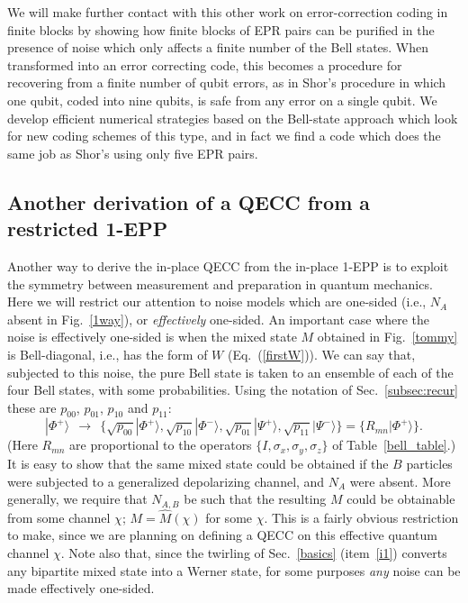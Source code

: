 We will make further contact with this other work on error-correction coding
in finite blocks by showing how finite blocks
of EPR pairs can be purified in the presence of noise which only
affects a finite number of the Bell states.  When transformed into an
error correcting code, this becomes a procedure for recovering from a
finite number of qubit errors, as in Shor's procedure in which one
qubit, coded into nine qubits, is safe from any error on a single
qubit.  We develop efficient numerical strategies based on the
Bell-state approach which look for new coding schemes of this type,
and in fact we find a code which does the same job as Shor's using
only five EPR pairs.
 
\subsection{Another derivation of a QECC from a restricted 1-EPP}
\label{subsec:equ}
 
Another way to derive the in-place QECC from the in-place 1-EPP is
to exploit the
symmetry between measurement and preparation in quantum mechanics.
Here we will restrict our attention to noise models which are one-sided
(i.e., $N_A$ absent in Fig.~\ref{1way}), or {\it effectively} one-sided.
An important case where the noise is effectively one-sided
is when the mixed state $M$ obtained in Fig.~\ref{tommy} is Bell-diagonal,
i.e., has the form of $W$ (Eq.~(\ref{firstW})).  We can say that,
subjected to this noise, the pure Bell state is taken to an
ensemble of each of the four Bell states, with some probabilities.  Using
the notation of Sec.~\ref{subsec:recur} these are
$p_{00}$, $p_{01}$, $p_{10}$ and $p_{11}$:
\begin{equation}
|\Phi^+\rangle\ \ \rightarrow\ \ \{\sqrt{p_{00}}|\Phi^+\rangle,
\sqrt{p_{10}}|\Phi^-\rangle,\sqrt{p_{01}}|\Psi^+\rangle,\sqrt{p_{11}}
|\Psi^-\rangle\}=\{R_{mn}|\Phi^+\rangle\}.\label{belmod}
\end{equation}
(Here $R_{mn}$ are proportional to the operators
$\{I,\sigma_x,\sigma_y,\sigma_z\}$ of Table~\ref{bell_table}.)  It is
easy to show that the same mixed state could be obtained if the $B$
particles were subjected to a generalized depolarizing channel, and
$N_A$ were absent.  More generally, we require that $N_{A,B}$ be such
that the resulting $M$ could be obtainable from some channel $\chi$;
$M=\hat{M}(\chi)$ for some $\chi$.  This is a fairly 
obvious restriction to make,
since we are planning on defining a QECC on this effective quantum
channel $\chi$.  Note also that, since the twirling of Sec.~\ref{basics} 
(item~\ref{i1}) converts any bipartite mixed state into a Werner state,
for some purposes {\em any} noise can be made effectively 
one-sided.
 

